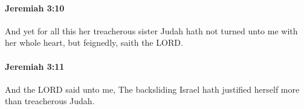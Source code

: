		\paragraph{Jeremiah 3:10} %
			\label{JEREMIAH-3-10}

			And yet for all this her treacherous sister Judah hath not turned unto me with her whole heart, but feignedly, saith the LORD.


		\paragraph{Jeremiah 3:11} %
			\label{JEREMIAH-3-11}

			And the LORD said unto me, The backsliding Israel hath justified herself more than treacherous Judah.


